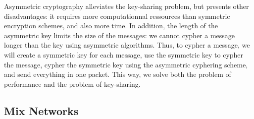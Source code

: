 \documentclass[11pt, a4paper]{article}
\begin{document}
        Asymmetric cryptography alleviates the key-sharing problem, but presents other disadvantages: it requires more computationnal ressources than symmetric encryption schemes, and also more time. In addition, the length of the asymmetric key limits the size of the messages: we cannot cypher a message longer than the key using asymmetric algorithms. Thus, to cypher a message, we will create a symmetric key for each message, use the symmetric key to cypher the message, cypher the symmetric key using the asymmetric cyphering scheme, and send everything in one packet. This way, we solve both the problem of performance and the problem of key-sharing.

    \subsection{Mix Networks}
\end{document}
